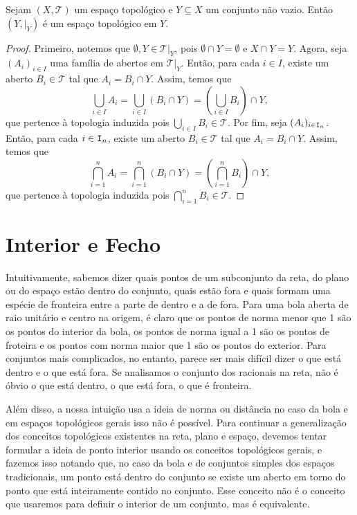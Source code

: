 \begin{prop}
	Sejam $(X,\mathcal T)$ um espaço topológico e $Y \subseteq X$ um conjunto não vazio. Então $(Y,\mathcal|_Y)$ é um espaço topológico em $Y$.
\end{prop}
\begin{proof}
	Primeiro, notemos que $\emptyset,Y \in \mathcal T|_Y$, pois $\emptyset \cap Y = \emptyset$ e $X \cap Y = Y$. Agora, seja $(A_i)_{i \in I}$ uma família de abertos em $\mathcal T|_Y$. Então, para cada $i \in I$, existe um aberto $B_i \in \mathcal T$ tal que $A_i = B_i \cap Y$. Assim, temos que
	\begin{equation*}
	\bigcup_{i \in I} A_i = \bigcup_{i \in I} (B_i \cap Y) = \left( \bigcup_{i \in I} B_i \right) \cap Y,
	\end{equation*}
que pertence à topologia induzida pois $\bigcup_{i \in I} B_i \in \mathcal T$. Por fim, seja $(A_i)_{i \in \mathtt I_n}$. Então, para cada $i \in \mathtt I_n$, existe um aberto $B_i \in \mathcal T$ tal que $A_i = B_i \cap Y$. Assim, temos que
	\begin{equation*}
	\bigcap_{i=1}^n A_i = \bigcap_{i=1}^n (B_i \cap Y) = \left( \bigcap_{i=1}^n B_i \right) \cap Y,
	\end{equation*}
que pertence à topologia induzida pois $\bigcap_{i=1}^n B_i \in \mathcal T$.
\end{proof}



\section{Interior e Fecho}

	Intuitivamente, sabemos dizer quais pontos de um subconjunto da reta, do plano ou do espaço estão dentro do conjunto, quais estão fora e quais formam uma espécie de fronteira entre a parte de dentro e a de fora. Para uma bola aberta de raio unitário e centro na origem, é claro que os pontos de norma menor que 1 são os pontos do interior da bola, os pontos de norma igual a 1 são os pontos de froteira e os pontos com norma maior que 1 são os pontos do exterior. Para conjuntos mais complicados, no entanto, parece ser mais difícil dizer o que está dentro e o que está fora. Se analisamos o conjunto dos racionais na reta, não é óbvio o que está dentro, o que está fora, o que é fronteira.
	
	Além disso, a nossa intuição usa a ideia de norma ou distância no caso da bola e em espaços topológicos gerais isso não é possível. Para continuar a generalização dos conceitos topológicos existentes na reta, plano e espaço, devemos tentar formular a ideia de ponto interior usando os conceitos topológicos gerais, e fazemos isso notando que, no caso da bola e de conjuntos simples dos espaços tradicionais, um ponto está dentro do conjunto se existe um aberto em torno do ponto que está inteiramente contido no conjunto. Esse conceito não é o conceito que usaremos para definir o interior de um conjunto, mas é equivalente.
	
